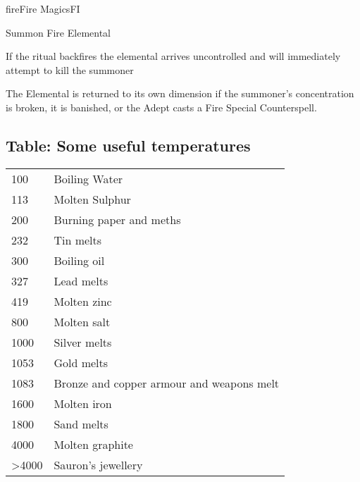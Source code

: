 \begin{college}[2.0]{fire}{Fire Magics}{FI}
\begin{ritual}[R-4]{Summon Fire Elemental}
\begin{effects}
If the ritual backfires the elemental arrives uncontrolled and will
immediately attempt to kill the summoner

The Elemental is returned to its own dimension if the summoner's
concentration is broken, it is banished, or the Adept casts a Fire
Special Counterspell.
\end{effects}
\end{ritual}

\subsection{Table: Some useful temperatures}

\begin{center}
\begin{tabularx}{\linewidth}{lX}
100	& Boiling Water \\
113	& Molten Sulphur \\
200	& Burning paper and meths \\
232	& Tin melts \\
300	& Boiling oil \\
327	& Lead melts \\
419	& Molten zinc \\
800	& Molten salt \\
1000	& Silver melts \\
1053	& Gold melts \\
1083	& Bronze and copper armour and weapons melt \\
1600	& Molten iron \\
1800	& Sand melts \\
4000	& Molten graphite \\
>4000	& Sauron's jewellery \\
\end{tabularx}
\end{center}
\end{college}

